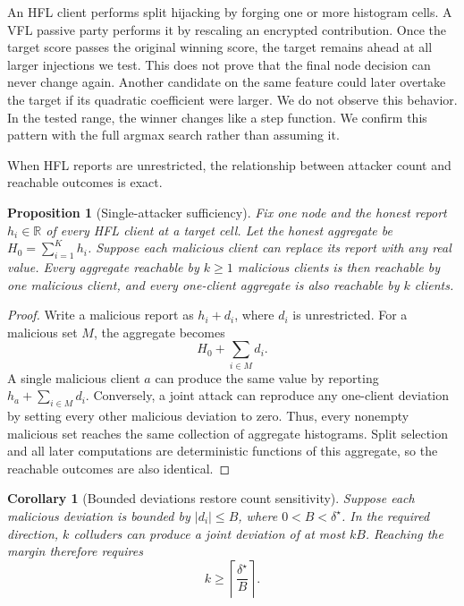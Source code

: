 \documentclass[11pt]{article}
\newtheorem{proposition}{Proposition}
\newtheorem{corollary}{Corollary}
\begin{document}
An HFL client performs split hijacking by forging one or more histogram cells. A VFL passive party performs it by rescaling an encrypted contribution. Once the target score passes the original winning score, the target remains ahead at all larger injections we test. This does not prove that the final node decision can never change again. Another candidate on the same feature could later overtake the target if its quadratic coefficient were larger. We do not observe this behavior. In the tested range, the winner changes like a step function. We confirm this pattern with the full argmax search rather than assuming it.

When HFL reports are unrestricted, the relationship between attacker count and reachable outcomes is exact.

\begin{proposition}[Single-attacker sufficiency]
\label{prop:singleattacker}
Fix one node and the honest report $h_i\in\mathbb{R}$ of every HFL client at a target cell. Let the honest aggregate be $H_0=\sum_{i=1}^K h_i$. Suppose each malicious client can replace its report with any real value. Every aggregate reachable by $k\geq1$ malicious clients is then reachable by one malicious client, and every one-client aggregate is also reachable by $k$ clients.
\end{proposition}

\begin{proof}
Write a malicious report as $h_i+d_i$, where $d_i$ is unrestricted. For a malicious set $M$, the aggregate becomes
\[
H_0+\sum_{i\in M}d_i.
\]
A single malicious client $a$ can produce the same value by reporting $h_a+\sum_{i\in M}d_i$. Conversely, a joint attack can reproduce any one-client deviation by setting every other malicious deviation to zero. Thus, every nonempty malicious set reaches the same collection of aggregate histograms. Split selection and all later computations are deterministic functions of this aggregate, so the reachable outcomes are also identical.
\end{proof}

\begin{corollary}[Bounded deviations restore count sensitivity]
\label{cor:bounded}
Suppose each malicious deviation is bounded by $\lvert d_i\rvert\leq B$, where $0<B<\delta^\star$. In the required direction, $k$ colluders can produce a joint deviation of at most $kB$. Reaching the margin therefore requires
\[
k\geq\left\lceil\frac{\delta^\star}{B}\right\rceil.
\]
\end{corollary}
\end{document}
